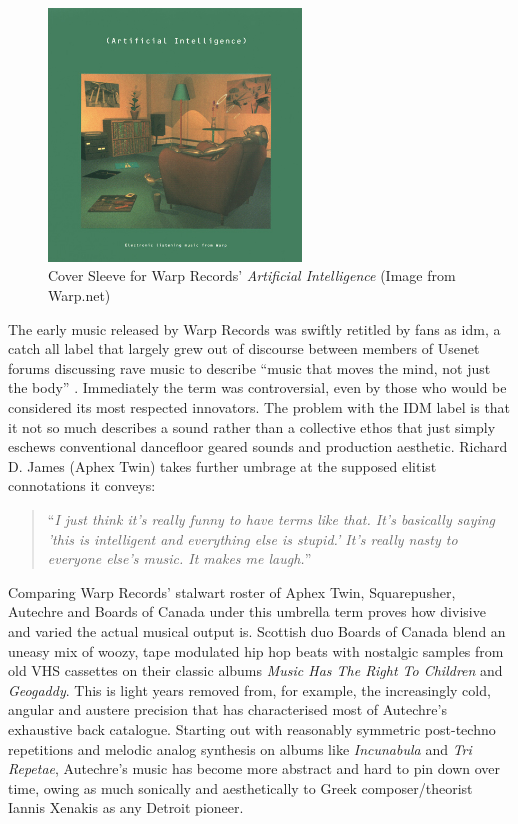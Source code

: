 \begin{figure}
	\begin{center}
		\includegraphics[width=0.6\textwidth]{ch02_dancemusic/figures/warp.jpg}
	\end{center}
	\caption[Cover Sleeve for Artificial Intelligence]{Cover Sleeve for Warp Records' \textit{Artificial Intelligence} (Image from Warp.net)}
	\label{fig:roland}
\end{figure}

The early music released by Warp Records was swiftly retitled by fans as \acrfull{idm}, a catch all label that largely grew out of discourse between members of Usenet forums discussing rave music to describe “music that moves the mind, not just the body” \cite{Alwakeel2009}. Immediately the term was controversial, even by those who would be considered its most respected innovators.  The problem with the IDM label is that it not so much describes a sound rather than a collective ethos that just simply eschews conventional dancefloor geared sounds and production aesthetic. Richard D. James (Aphex Twin) takes further umbrage at the supposed elitist connotations it conveys:

\blockcquote[]{Haworth2015}{``\textit{I just think it's really funny to have terms like that. It's basically saying 'this is intelligent and everything else is stupid.' It's really nasty to everyone else's music. It makes me laugh.}''}

Comparing Warp Records’ stalwart roster of Aphex Twin, Squarepusher, Autechre and Boards of Canada under this umbrella term proves how divisive and varied the actual musical output is. Scottish duo Boards of Canada blend an uneasy mix of woozy, tape modulated hip hop beats with nostalgic samples from old VHS cassettes on their classic albums \textit{Music Has The Right To Children} and \textit{Geogaddy}. This is light years removed from, for example, the increasingly cold, angular and austere precision that has characterised most of Autechre’s exhaustive back catalogue. Starting out with reasonably symmetric post-techno repetitions and melodic analog synthesis on albums like \textit{Incunabula} and \textit{Tri Repetae}, Autechre’s music has become more abstract and hard to pin down over time, owing as much sonically and aesthetically to Greek composer/theorist Iannis Xenakis as any Detroit pioneer.

